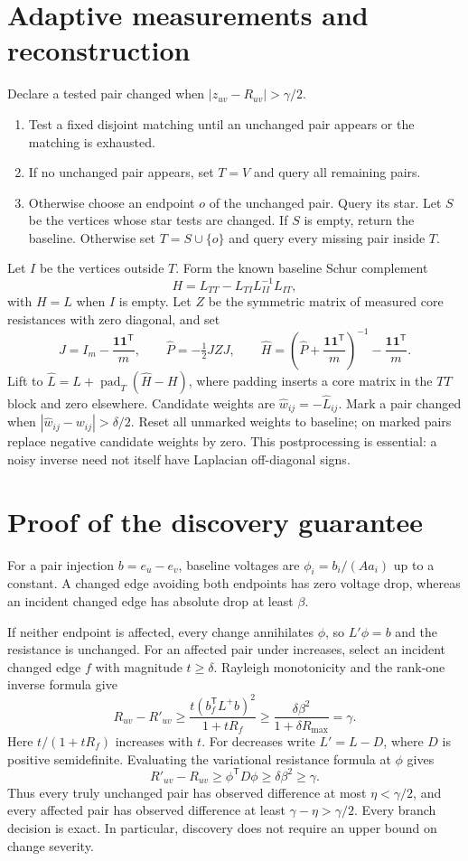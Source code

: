 \documentclass[11pt,letterpaper]{article}
\begin{document}
\section{Adaptive measurements and reconstruction}
Declare a tested pair changed when $|z_{uv}-R_{uv}|>\gamma/2$.
\begin{enumerate}
\item Test a fixed disjoint matching until an unchanged pair appears or the matching is exhausted.
\item If no unchanged pair appears, set $T=V$ and query all remaining pairs.
\item Otherwise choose an endpoint $o$ of the unchanged pair. Query its star. Let $S$ be the vertices whose star tests are changed. If $S$ is empty, return the baseline. Otherwise set $T=S\cup\{o\}$ and query every missing pair inside $T$.
\end{enumerate}
Let $I$ be the vertices outside $T$. Form the known baseline Schur complement
\[
 H=L_{TT}-L_{TI}L_{II}^{-1}L_{IT},
\]
with $H=L$ when $I$ is empty. Let $Z$ be the symmetric matrix of measured core resistances with zero diagonal, and set
\[
 J=I_m-\frac{\mathbf1\mathbf1^{\mathsf T}}m,\qquad
 \widehat P=-\tfrac12 JZJ,\qquad
 \widehat H=\left(\widehat P+\frac{\mathbf1\mathbf1^{\mathsf T}}m\right)^{-1}
       -\frac{\mathbf1\mathbf1^{\mathsf T}}m.
\]
Lift to $\widehat L=L+\operatorname{pad}_T(\widehat H-H)$, where padding inserts a core matrix in the $TT$ block and zero elsewhere. Candidate weights are $\widehat w_{ij}=-\widehat L_{ij}$. Mark a pair changed when $|\widehat w_{ij}-w_{ij}|>\delta/2$. Reset all unmarked weights to baseline; on marked pairs replace negative candidate weights by zero. This postprocessing is essential: a noisy inverse need not itself have Laplacian off-diagonal signs.

\section{Proof of the discovery guarantee}
For a pair injection $b=e_u-e_v$, baseline voltages are $\phi_i=b_i/(Aa_i)$ up to a constant. A changed edge avoiding both endpoints has zero voltage drop, whereas an incident changed edge has absolute drop at least $\beta$.

If neither endpoint is affected, every change annihilates $\phi$, so $L'\phi=b$ and the resistance is unchanged. For an affected pair under increases, select an incident changed edge $f$ with magnitude $t\ge\delta$. Rayleigh monotonicity and the rank-one inverse formula give
\[
 R_{uv}-R'_{uv}\ge
 \frac{t(b_f^{\mathsf T}L^+b)^2}{1+tR_f}
 \ge\frac{\delta\beta^2}{1+\delta R_{\max}}=\gamma.
\]
Here $t/(1+tR_f)$ increases with $t$. For decreases write $L'=L-D$, where $D$ is positive semidefinite. Evaluating the variational resistance formula at $\phi$ gives
\[
 R'_{uv}-R_{uv}\ge\phi^{\mathsf T}D\phi\ge\delta\beta^2\ge\gamma.
\]
Thus every truly unchanged pair has observed difference at most $\eta<\gamma/2$, and every affected pair has observed difference at least $\gamma-\eta>\gamma/2$. Every branch decision is exact. In particular, discovery does not require an upper bound on change severity.
\end{document}
